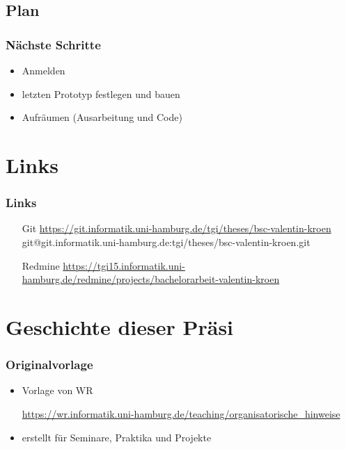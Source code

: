 \subsection*{Plan}
\begin{frame}
	\frametitle{Nächste Schritte}
	
	\begin{itemize}
		\item Anmelden
		\item letzten Prototyp festlegen und bauen
		\item Aufräumen (Ausarbeitung und Code)
	\end{itemize}
\end{frame}

\section*{Links}

\begin{frame}
	\frametitle{Links}
	
	\begin{itemize}
		\item[Git] \url{https://git.informatik.uni-hamburg.de/tgi/theses/bsc-valentin-kroen}\\
			git@git.informatik.uni-hamburg.de:tgi/theses/bsc-valentin-kroen.git
		
		\item[Redmine] \url{https://tgi15.informatik.uni-hamburg.de/redmine/projects/bachelorarbeit-valentin-kroen}
	\end{itemize}
\end{frame}


\printbibliography

\appendix
{}
\setcounter{finalframe}{\value{framenumber}}

\section{Geschichte dieser Präsi}
\begin{frame}
	\frametitle{Originalvorlage}
	
	\begin{itemize}
		\item Vorlage von WR
		\item[] \url{https://wr.informatik.uni-hamburg.de/teaching/organisatorische_hinweise}
		\item erstellt für Seminare, Praktika und Projekte
	\end{itemize}
\end{frame}

